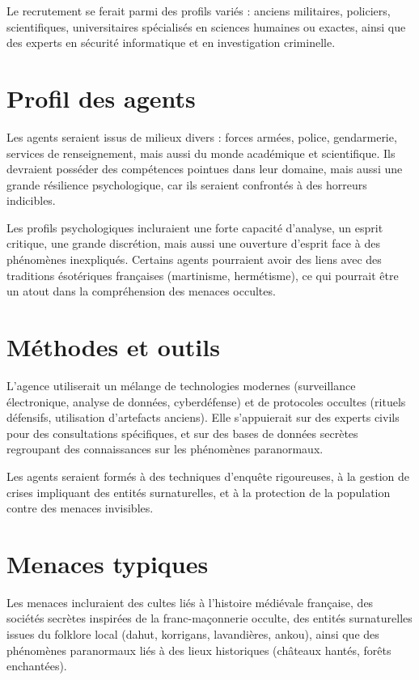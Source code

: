 \documentclass[10pt,a5paper,twoside]{book}
\begin{document}
Le recrutement se ferait parmi des profils variés : anciens militaires, policiers, scientifiques, universitaires spécialisés en sciences humaines ou exactes, ainsi que des experts en sécurité informatique et en investigation criminelle.

\section{Profil des agents}

Les agents seraient issus de milieux divers : forces armées, police, gendarmerie, services de renseignement, mais aussi du monde académique et scientifique. Ils devraient posséder des compétences pointues dans leur domaine, mais aussi une grande résilience psychologique, car ils seraient confrontés à des horreurs indicibles.

Les profils psychologiques incluraient une forte capacité d'analyse, un esprit critique, une grande discrétion, mais aussi une ouverture d'esprit face à des phénomènes inexpliqués. Certains agents pourraient avoir des liens avec des traditions ésotériques françaises (martinisme, hermétisme), ce qui pourrait être un atout dans la compréhension des menaces occultes.

\section{Méthodes et outils}

L'agence utiliserait un mélange de technologies modernes (surveillance électronique, analyse de données, cyberdéfense) et de protocoles occultes (rituels défensifs, utilisation d'artefacts anciens). Elle s'appuierait sur des experts civils pour des consultations spécifiques, et sur des bases de données secrètes regroupant des connaissances sur les phénomènes paranormaux.

Les agents seraient formés à des techniques d'enquête rigoureuses, à la gestion de crises impliquant des entités surnaturelles, et à la protection de la population contre des menaces invisibles.

\section{Menaces typiques}

Les menaces incluraient des cultes liés à l'histoire médiévale française, des sociétés secrètes inspirées de la franc-maçonnerie occulte, des entités surnaturelles issues du folklore local (dahut, korrigans, lavandières, ankou), ainsi que des phénomènes paranormaux liés à des lieux historiques (châteaux hantés, forêts enchantées).
\end{document}
